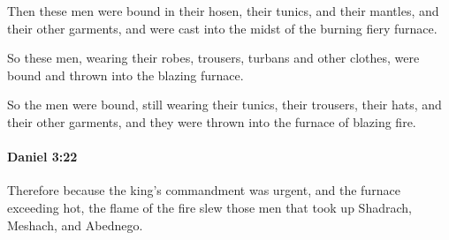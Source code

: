 			\begin{versebox}
					\item[BHS] 
					\item[LXX] 
					\item[ASV] Then these men were bound in their hosen, their tunics, and their mantles, and their other garments, and were cast into the midst of the burning fiery furnace.
					\item[NIV] So these men, wearing their robes, trousers, turbans and other clothes, were bound and thrown into the blazing furnace.
					\item[NRSV] So the men were bound, still wearing their tunics, their trousers, their hats, and their other garments, and they were thrown into the furnace of blazing fire.
			\end{versebox}

		\paragraph{Daniel 3:22} %
			\label{DANIEL-3-22}

			Therefore because the king’s commandment was urgent, and the furnace exceeding hot, the flame of the fire slew those men that took up Shadrach, Meshach, and Abednego.

